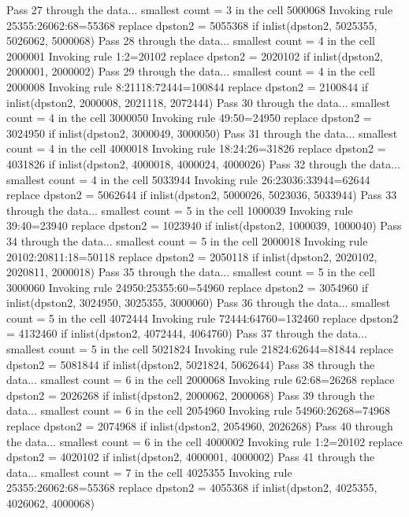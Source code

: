Pass 27 through the data...
  smallest count = 3 in the cell      5000068
  Invoking rule 25355:26062:68=55368
  replace dpston2 = 5055368 if inlist(dpston2, 5025355, 5026062, 5000068)
Pass 28 through the data...
  smallest count = 4 in the cell      2000001
  Invoking rule 1:2=20102
  replace dpston2 = 2020102 if inlist(dpston2, 2000001, 2000002)
Pass 29 through the data...
  smallest count = 4 in the cell      2000008
  Invoking rule 8:21118:72444=100844
  replace dpston2 = 2100844 if inlist(dpston2, 2000008, 2021118, 2072444)
Pass 30 through the data...
  smallest count = 4 in the cell      3000050
  Invoking rule 49:50=24950
  replace dpston2 = 3024950 if inlist(dpston2, 3000049, 3000050)
Pass 31 through the data...
  smallest count = 4 in the cell      4000018
  Invoking rule 18:24:26=31826
  replace dpston2 = 4031826 if inlist(dpston2, 4000018, 4000024, 4000026)
Pass 32 through the data...
  smallest count = 4 in the cell      5033944
  Invoking rule 26:23036:33944=62644
  replace dpston2 = 5062644 if inlist(dpston2, 5000026, 5023036, 5033944)
Pass 33 through the data...
  smallest count = 5 in the cell      1000039
  Invoking rule 39:40=23940
  replace dpston2 = 1023940 if inlist(dpston2, 1000039, 1000040)
Pass 34 through the data...
  smallest count = 5 in the cell      2000018
  Invoking rule 20102:20811:18=50118
  replace dpston2 = 2050118 if inlist(dpston2, 2020102, 2020811, 2000018)
Pass 35 through the data...
  smallest count = 5 in the cell      3000060
  Invoking rule 24950:25355:60=54960
  replace dpston2 = 3054960 if inlist(dpston2, 3024950, 3025355, 3000060)
Pass 36 through the data...
  smallest count = 5 in the cell      4072444
  Invoking rule 72444:64760=132460
  replace dpston2 = 4132460 if inlist(dpston2, 4072444, 4064760)
Pass 37 through the data...
  smallest count = 5 in the cell      5021824
  Invoking rule 21824:62644=81844
  replace dpston2 = 5081844 if inlist(dpston2, 5021824, 5062644)
Pass 38 through the data...
  smallest count = 6 in the cell      2000068
  Invoking rule 62:68=26268
  replace dpston2 = 2026268 if inlist(dpston2, 2000062, 2000068)
Pass 39 through the data...
  smallest count = 6 in the cell      2054960
  Invoking rule 54960:26268=74968
  replace dpston2 = 2074968 if inlist(dpston2, 2054960, 2026268)
Pass 40 through the data...
  smallest count = 6 in the cell      4000002
  Invoking rule 1:2=20102
  replace dpston2 = 4020102 if inlist(dpston2, 4000001, 4000002)
Pass 41 through the data...
  smallest count = 7 in the cell      4025355
  Invoking rule 25355:26062:68=55368
  replace dpston2 = 4055368 if inlist(dpston2, 4025355, 4026062, 4000068)
